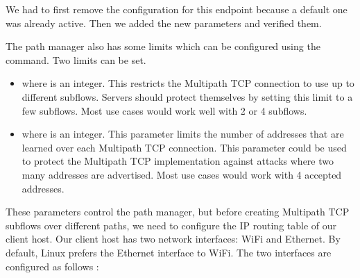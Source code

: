 \documentclass[letterpaper,10pt,english]{sphinxmanual}
\begin{document}
\sphinxAtStartPar
We had to first remove the configuration for this endpoint because a default one was already active. Then we added the new parameters and verified them.

\sphinxAtStartPar
The path manager also has some limits which can be configured using the  command. Two limits can be set.
\begin{itemize}
\item {} 
\sphinxAtStartPar
{} where  is an integer. This restricts the Multipath TCP connection to use up to  different subflows. Servers should protect themselves by setting this limit to a few subflows. Most use cases would work well with 2 or 4 subflows.

\item {} 
\sphinxAtStartPar
{} where  is an integer. This parameter limits the number of addresses that are learned over each Multipath TCP connection. This parameter could be used to protect the Multipath TCP implementation against attacks where two many addresses are advertised. Most use cases would work with 4 accepted addresses.

\end{itemize}

\sphinxAtStartPar
These parameters control the path manager, but before creating Multipath TCP subflows over different paths, we need to configure the IP routing table of our client host. Our client host has two network interfaces: Wi\sphinxhyphen{}Fi and Ethernet. By default, Linux prefers the Ethernet interface to Wi\sphinxhyphen{}Fi. The two interfaces are configured as follows :

\begin{sphinxVerbatim}[commandchars=\\\{\}]
\end{sphinxVerbatim}
\end{document}
